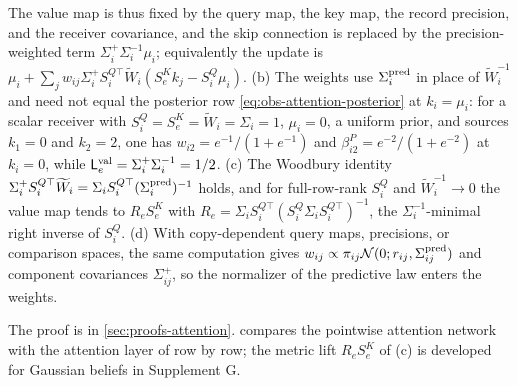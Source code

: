 The value map is thus fixed by the query map, the key map, the record
precision, and the receiver covariance, and the skip connection is replaced by
the precision-weighted term \(\Sigma_i^+\Sigma_i^{-1}\mu_i\); equivalently the
update is
\(\mu_i+\sum_jw_{ij}\Sigma_i^+S_i^{Q\top}\widetilde W_i(S^K_ek_j-S^Q_i\mu_i)\).
(b) The weights use \(\Sigma_i^{\rm pred}\) in place of \(\widetilde W_i^{-1}\)
and need not equal the posterior row \eqref{eq:obs-attention-posterior} at
\(k_i=\mu_i\): for a scalar receiver with
\(S^Q_i=S^K_e=\widetilde W_i=\Sigma_i=1\), \(\mu_i=0\), a uniform prior, and
sources \(k_1=0\) and \(k_2=2\), one has \(w_{i2}=e^{-1}/(1+e^{-1})\) and
\(\beta^P_{i2}=e^{-2}/(1+e^{-2})\) at \(k_i=0\), while
\(\mathsf L_e^{\rm val}=\Sigma_i^+\Sigma_i^{-1}=1/2\). (c) The Woodbury identity
\(\Sigma_i^+S_i^{Q\top}\widetilde W_i=\Sigma_iS_i^{Q\top}(\Sigma_i^{\rm pred})^{-1}\)
holds, and for full-row-rank \(S^Q_i\) and \(\widetilde W_i^{-1}\to0\) the value
map tends to \(R_eS^K_e\) with
\(R_e=\Sigma_iS_i^{Q\top}(S^Q_i\Sigma_iS_i^{Q\top})^{-1}\), the
\(\Sigma_i^{-1}\)-minimal right inverse of \(S^Q_i\). (d) With copy-dependent
query maps, precisions, or comparison spaces, the same computation gives
\(w_{ij}\propto\pi_{ij}\mathcal N(0;r_{ij},\Sigma_{ij}^{\rm pred})\) and
component covariances \(\Sigma_{ij}^+\), so the normalizer of the predictive
law enters the weights.

The proof is in \cref{sec:proofs-attention}.
 compares the pointwise attention
network with the attention layer of \citet{vaswani2017attention} row by row;
the metric lift \(R_eS^K_e\) of (c) is developed for Gaussian beliefs in
Supplement G.

